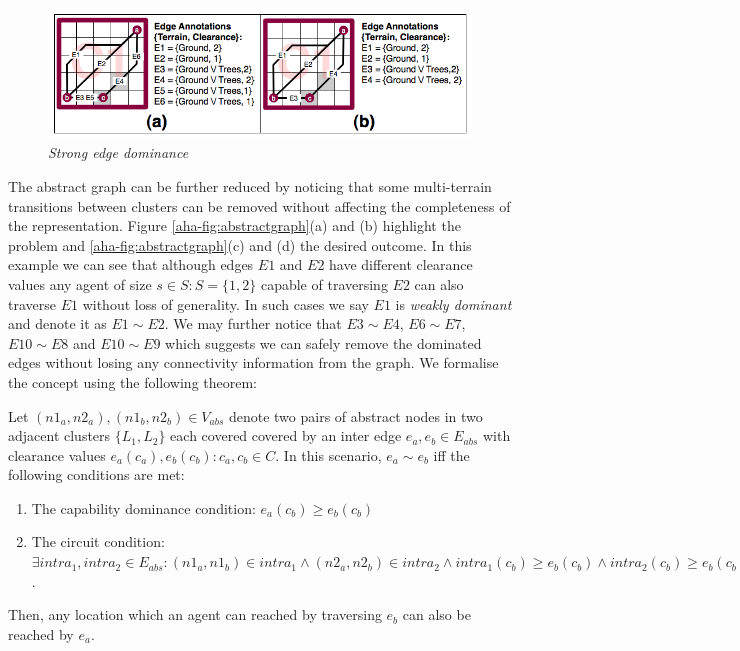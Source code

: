 \begin{figure}[htbp]
        \caption{\emph{Strong edge dominance} }
        \begin{center}
                        \includegraphics[scale=0.3]{diagrams/intraedges_initial.png}
        \end{center}
        \label{aha-fig:strongdominance}
\end{figure}

The abstract graph can be further reduced by noticing that some multi-terrain transitions between clusters can be removed without affecting the completeness of the representation. 
Figure \ref{aha-fig:abstractgraph}(a) and (b) highlight the problem and \ref{aha-fig:abstractgraph}(c) and (d) the desired outcome.
In this example we can see that although edges $E1$ and $E2$ have different clearance values any agent of size $s \in S : S = \lbrace 1, 2 \rbrace$ capable of traversing $E2$ can also traverse $E1$ without loss of generality. 
In such cases we say $E1$ is \emph{weakly dominant} and denote it as $E1 \sim E2$. 
We may further notice that $E3 \sim E4$, $E6 \sim E7$, $E10 \sim E8$ and $E10 \sim E9$ which suggests we can safely remove the dominated edges without losing any connectivity information from the graph. 
We formalise the concept using the following theorem:
\begin{theorem}
\label{aha-theorem:weakdominance}
Let $(n1_{a}, n2_{a}), (n1_{b}, n2_{b}) \in V_{abs}$ denote two pairs of abstract nodes in two adjacent clusters $\lbrace L_{1}, L_{2} \rbrace$ each covered covered by an inter edge $e_{a}, e_{b} \in E_{abs}$ with clearance values $e_{a}(c_{a}), e_{b}(c_{b})  : c_{a}, c_{b} \in C$.
 In this scenario, $e_{a} \sim e_{b}$ iff the following conditions are met:
\begin{enumerate}
\item{The capability dominance condition: $e_{a}(c_{b}) \geq e_{b}(c_{b})$}
\item{The circuit condition: $\exists intra_{1}, intra_{2} \in E_{abs} : (n1_{a}, n1_{b}) \in intra_{1} \wedge (n2_{a}, n2_{b}) \in intra_{2} \wedge intra_{1}(c_{b}) \geq e_{b}(c_{b}) \wedge intra_{2}(c_{b}) \geq e_{b}(c_{b})$.}
\end{enumerate}
Then, any location which an agent can reached by traversing $e_{b}$ can also be reached by $e_{a}$.
\end{theorem}

